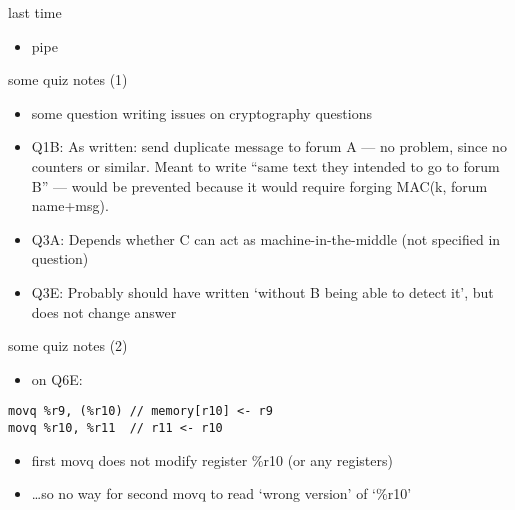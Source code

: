 \date{}
\title{}
\date{}

\begin{frame}
    \titlepage
\end{frame}


\usetikzlibrary{circuits.logic.mux,matrix}





\begin{frame}{last time}
    \begin{itemize}
    \item pipe
    \end{itemize}
\end{frame}

\begin{frame}{some quiz notes (1)}
    \begin{itemize}
    \item some question writing issues on cryptography questions
    \vspace{.5cm}
    \item Q1B: As written: send duplicate message to forum A --- no problem, since no counters or similar. Meant to write ``same text they intended to go to forum B'' --- would be prevented because it would require forging MAC(k, forum name+msg).
    \item Q3A: Depends whether C can act as machine-in-the-middle (not specified in question)
    \item Q3E: Probably should have written `without B being able to detect it', but does not change answer
    \end{itemize}
\end{frame}

\begin{frame}[fragile]{some quiz notes (2)}
    \begin{itemize}
    \item on Q6E:
    \end{itemize}
\begin{Verbatim}
movq %r9, (%r10) // memory[r10] <- r9
movq %r10, %r11  // r11 <- r10
\end{Verbatim}
    \begin{itemize}
    \item first movq does not modify register \%r10 (or any registers)
    \item \ldots so no way for second movq to read `wrong version' of `\%r10'
    \end{itemize}
\end{frame}

